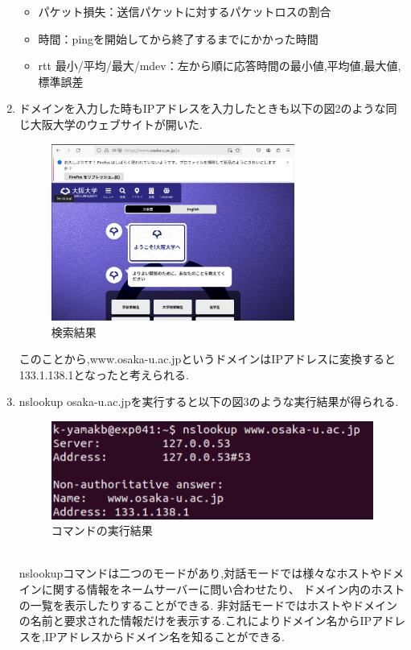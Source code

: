 \documentclass[dvipdfmx]{jarticle}
\begin{document}
\begin{enumerate}
\begin{itemize}
        \item パケット損失：送信パケットに対するパケットロスの割合
        \item 時間：pingを開始してから終了するまでにかかった時間
        \item rtt 最小/平均/最大/mdev：左から順に応答時間の最小値,平均値,最大値,標準誤差
    \end{itemize}
    \clearpage
    \item ドメインを入力した時もIPアドレスを入力したときも以下の図2のような同じ大阪大学のウェブサイトが開いた.
    \begin{figure}[h]
        \centering
        \includegraphics[width=8cm]{1-1-2.png}
        \caption{検索結果}
    \end{figure}
    このことから,www.osaka-u.ac.jpというドメインはIPアドレスに変換すると133.1.138.1となったと考えられる.
    \item nslookup osaka-u.ac.jpを実行すると以下の図3のような実行結果が得られる.
    \begin{figure}[h]
        \centering
        \includegraphics[width=12cm]{1-1-3.png}
        \caption{コマンドの実行結果}
    \end{figure}
    \\nslookupコマンドは二つのモードがあり,対話モードでは様々なホストやドメインに関する情報をネームサーバーに問い合わせたり、 ドメイン内のホストの一覧を表示したりすることができる.
    非対話モードではホストやドメインの名前と要求された情報だけを表示する.これによりドメイン名からIPアドレスを,IPアドレスからドメイン名を知ることができる.\\

\end{enumerate}
\end{document}
